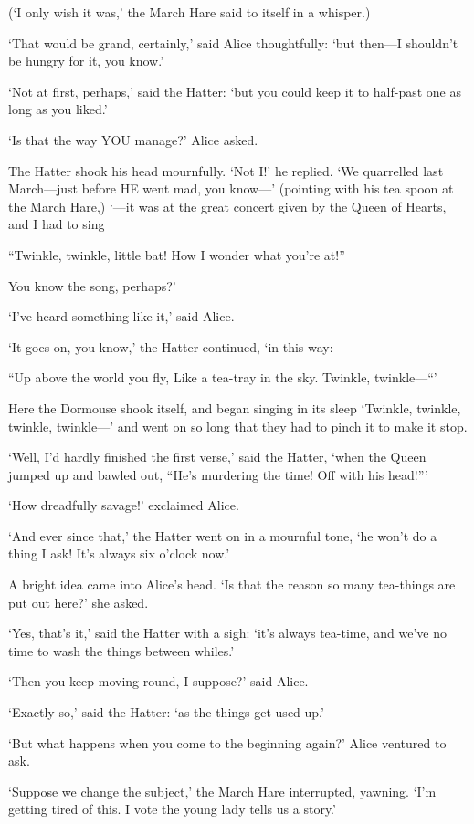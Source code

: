 \documentclass[12pt]{article}
\begin{document}
\begin{Parallel}[p]{}{}
{(‘I only wish it was,’ the March Hare said to itself in a whisper.)

‘That would be grand, certainly,’ said Alice thoughtfully: ‘but then—I shouldn’t be hungry for it, you know.’

‘Not at first, perhaps,’ said the Hatter: ‘but you could keep it to half-past one as long as you liked.’

‘Is that the way YOU manage?’ Alice asked.

The Hatter shook his head mournfully. ‘Not I!’ he replied. ‘We quarrelled last March—just before HE went mad, you know—’ (pointing with his tea spoon at the March Hare,) ‘—it was at the great concert given by the Queen of Hearts, and I had to sing

     “Twinkle, twinkle, little bat!
     How I wonder what you’re at!”

You know the song, perhaps?’

‘I’ve heard something like it,’ said Alice.

‘It goes on, you know,’ the Hatter continued, ‘in this way:—

     “Up above the world you fly,
     Like a tea-tray in the sky.
         Twinkle, twinkle—“’

Here the Dormouse shook itself, and began singing in its sleep ‘Twinkle, twinkle, twinkle, twinkle—’ and went on so long that they had to pinch it to make it stop.

‘Well, I’d hardly finished the first verse,’ said the Hatter, ‘when the Queen jumped up and bawled out, “He’s murdering the time! Off with his head!”’

‘How dreadfully savage!’ exclaimed Alice.

‘And ever since that,’ the Hatter went on in a mournful tone, ‘he won’t do a thing I ask! It’s always six o’clock now.’

A bright idea came into Alice’s head. ‘Is that the reason so many tea-things are put out here?’ she asked.

‘Yes, that’s it,’ said the Hatter with a sigh: ‘it’s always tea-time, and we’ve no time to wash the things between whiles.’

‘Then you keep moving round, I suppose?’ said Alice.

‘Exactly so,’ said the Hatter: ‘as the things get used up.’

‘But what happens when you come to the beginning again?’ Alice ventured to ask.

‘Suppose we change the subject,’ the March Hare interrupted, yawning. ‘I’m getting tired of this. I vote the young lady tells us a story.’

}
\end{Parallel}
\end{document}
